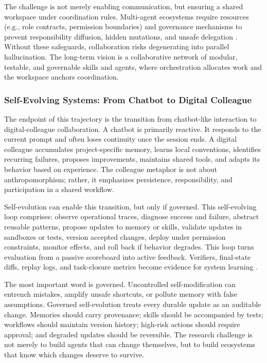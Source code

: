 The challenge is not merely enabling communication, but ensuring a shared workspace under coordination rules. Multi-agent ecosystems require resources (e.g., role contracts, permission boundaries) and governance mechanisms to prevent responsibility diffusion, hidden mutations, and unsafe delegation \citep{li2026prism,zhao2026clawguard,gruber2026agenticforensics}. Without these safeguards, collaboration risks degenerating into parallel hallucination. The long-term vision is a collaborative network of modular, testable, and governable skills and agents, where orchestration allocates work and the workspace anchors coordination.

\subsubsection{Self-Evolving Systems: From Chatbot to Digital Colleague}

The endpoint of this trajectory is the transition from chatbot-like interaction to digital-colleague collaboration. A chatbot is primarily reactive. It responds to the current prompt and often loses continuity once the session ends. A digital colleague accumulates project-specific memory, learns local conventions, identifies recurring failures, proposes improvements, maintains shared tools, and adapts its behavior based on experience. The colleague metaphor is not about anthropomorphism; rather, it emphasizes persistence, responsibility, and participation in a shared workflow.

Self-evolution can enable this transition, but only if governed. This self-evolving loop comprises: observe operational traces, diagnose success and failure, abstract reusable patterns, propose updates to memory or skills, validate updates in sandboxes or tests, version accepted changes, deploy under permission constraints, monitor effects, and roll back if behavior degrades. This loop turns evaluation from a passive scoreboard into active feedback. Verifiers, final-state diffs, replay logs, and task-closure metrics become evidence for system learning \citep{rabanser2026sciencereliability,rosset2026verifiers}.

The most important word is governed. Uncontrolled self-modification can entrench mistakes, amplify unsafe shortcuts, or pollute memory with false assumptions. Governed self-evolution treats every durable update as an auditable change. Memories should carry provenance; skills should be accompanied by tests; workflows should maintain version history; high-risk actions should require approval; and degraded updates should be reversible. The research challenge is not merely to build agents that can change themselves, but to build ecosystems that know which changes deserve to survive.

